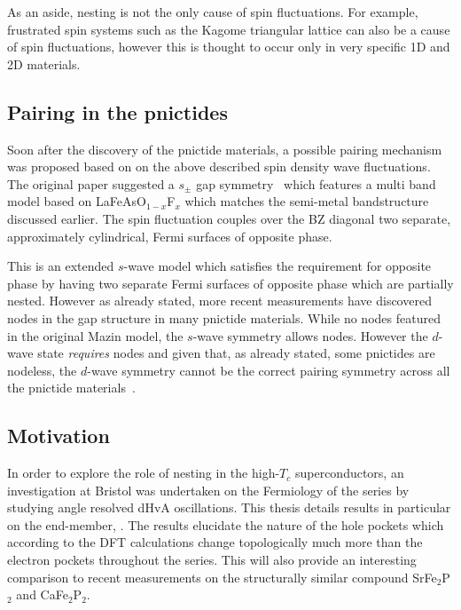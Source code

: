As an aside, nesting is not the only cause of spin fluctuations. For example, frustrated spin systems such as the Kagome triangular lattice can also be a cause of spin fluctuations, however this is thought to occur only in very specific 1D and 2D materials.

\subsection{Pairing in the pnictides}

Soon after the discovery of the pnictide materials, a possible pairing mechanism was proposed based on on the above described spin density wave fluctuations. The original paper suggested a $s_{\pm}$ gap symmetry~\cite{Mazin2008} which features a multi band model based on LaFeAsO$_{1-x}$F$_x$ which matches the semi-metal bandstructure discussed earlier. The spin fluctuation couples over the \ac{BZ} diagonal two separate, approximately cylindrical, Fermi surfaces of opposite phase. 

This is an extended $s$-wave model which satisfies the requirement for opposite phase by having two separate Fermi surfaces of opposite phase which are partially nested. However as already stated, more recent measurements have discovered nodes in the gap structure in many pnictide materials. While no nodes featured in the original Mazin model, the $s$-wave symmetry allows nodes. However the $d$-wave state \emph{requires} nodes and given that, as already stated, some pnictides are nodeless, the $d$-wave symmetry cannot be the correct pairing symmetry across all the pnictide materials~\cite{Mazin2010}.


\subsection{Motivation}
    \label{Sec:Intro:MotivationPnictide}

In order to explore the role of nesting in the high-$T_c$ superconductors, an investigation at Bristol was undertaken on the Fermiology of the \BaFeAsP{} series by studying angle resolved \ac{dHvA} oscillations. This thesis details results in particular on the end-member, \BaFeP. The results elucidate the nature of the hole pockets which according to the \ac{DFT} calculations change topologically much more than the electron pockets throughout the series. This will also provide an interesting comparison to recent measurements on the structurally similar compound SrFe$_2$P$_2$ and CaFe$_2$P$_2$.

